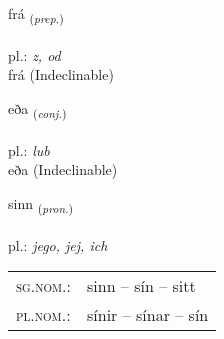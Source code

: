 \documentclass[frontgrid, backgrid]{flacards}\usepackage[]{graphicx}\usepackage[]{xcolor}
\begin{document}
{frá \small{\textsubscript{(\textit{prep.})}} \\[1ex]
\textphonetic{[frauː]} \\
pl.: \emph{z, od} \\  [2ex]
frá (Indeclinable)}


\renewcommand{\flhead}{\vskip5pt \fboxsep=0pt {\small\bfseries\footnotesize Samtenging | spójnik}}
\renewcommand{\fcfoot}{\vskip5pt \fboxsep=0pt \hspace{2pt}{\small\bfseries\footnotesize 1K}}

\renewcommand{\blhead}{\vskip5pt {\small\bfseries\footnotesize Samtenging | spójnik }}
\renewcommand{\bcfoot}{\vskip5pt \hspace{2pt}{\small\bfseries\footnotesize 1K}}


{eða \small{\textsubscript{(\textit{conj.})}} \\[1ex]
\textphonetic{[ɛːða]} \\
pl.: \emph{lub} \\  [2ex]
eða (Indeclinable)}

\renewcommand{\flhead}{\vskip5pt \fboxsep=0pt {\small\bfseries\footnotesize Fornafn | zaimek}}
\renewcommand{\fcfoot}{\vskip5pt \fboxsep=0pt \hspace{2pt}{\small\bfseries\footnotesize 1K}}

\renewcommand{\blhead}{\vskip5pt {\small\bfseries\footnotesize Fornafn | zaimek }}
\renewcommand{\bcfoot}{\vskip5pt \hspace{2pt}{\small\bfseries\footnotesize 1K}}


{sinn \small{\textsubscript{(\textit{pron.})}} \\[1ex] %
\textphonetic{[sɪn]} \\
pl.: \emph{jego, jej, ich} \\  [2ex]
\renewcommand*{\arraystretch}{0.8}
\begin{tabular}{ll}
\textsc{sg.nom.}: & sinn  --  sín -- sitt \\ 
\textsc{pl.nom.}: & sínir -- sínar -- sín
\end{tabular}
}
\end{document}
